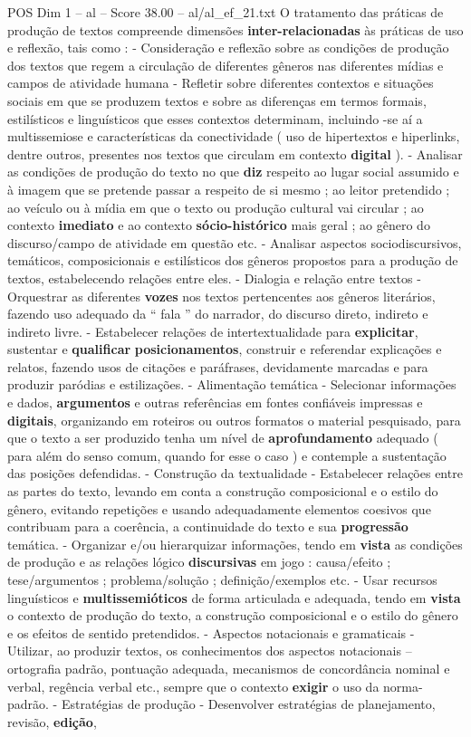 \begin{textsample}{POS Dim 1 – al – Score 38.00 – al/al\_ef\_21.txt}
O tratamento das práticas de produção de textos compreende dimensões \textbf{inter-relacionadas} às práticas de uso e reflexão, tais como : - Consideração e reflexão sobre as condições de produção dos textos que regem a circulação de diferentes gêneros nas diferentes mídias e campos de atividade humana - Refletir sobre diferentes contextos e situações sociais em que se produzem textos e sobre as diferenças em termos formais, estilísticos e linguísticos que esses contextos determinam, incluindo -se aí a multissemiose e características da conectividade ( uso de hipertextos e hiperlinks, dentre outros, presentes nos textos que circulam em contexto \textbf{digital} ). - Analisar as condições de produção do texto no que \textbf{diz} respeito ao lugar social assumido e à imagem que se pretende passar a respeito de si mesmo ; ao leitor pretendido ; ao veículo ou à mídia em que o texto ou produção cultural vai circular ; ao contexto \textbf{imediato} e ao contexto \textbf{sócio-histórico} mais geral ; ao gênero do discurso/campo de atividade em questão etc. - Analisar aspectos sociodiscursivos, temáticos, composicionais e estilísticos dos gêneros propostos para a produção de textos, estabelecendo relações entre eles. - Dialogia e relação entre textos - Orquestrar as diferentes \textbf{vozes} nos textos pertencentes aos gêneros literários, fazendo uso adequado da “ fala ” do narrador, do discurso direto, indireto e indireto livre. - Estabelecer relações de intertextualidade para \textbf{explicitar}, sustentar e \textbf{qualificar} \textbf{posicionamentos}, construir e referendar explicações e relatos, fazendo usos de citações e paráfrases, devidamente marcadas e para produzir paródias e estilizações. - Alimentação temática - Selecionar informações e dados, \textbf{argumentos} e outras referências em fontes confiáveis impressas e \textbf{digitais}, organizando em roteiros ou outros formatos o material pesquisado, para que o texto a ser produzido tenha um nível de \textbf{aprofundamento} adequado ( para além do senso comum, quando for esse o caso ) e contemple a sustentação das posições defendidas. - Construção da textualidade - Estabelecer relações entre as partes do texto, levando em conta a construção composicional e o estilo do gênero, evitando repetições e usando adequadamente elementos coesivos que contribuam para a coerência, a continuidade do texto e sua \textbf{progressão} temática. - Organizar e/ou hierarquizar informações, tendo em \textbf{vista} as condições de produção e as relações lógico \textbf{discursivas} em jogo : causa/efeito ; tese/argumentos ; problema/solução ; definição/exemplos etc. - Usar recursos linguísticos e \textbf{multissemióticos} de forma articulada e adequada, tendo em \textbf{vista} o contexto de produção do texto, a construção composicional e o estilo do gênero e os efeitos de sentido pretendidos. - Aspectos notacionais e gramaticais - Utilizar, ao produzir textos, os conhecimentos dos aspectos notacionais – ortografia padrão, pontuação adequada, mecanismos de concordância nominal e verbal, regência verbal etc., sempre que o contexto \textbf{exigir} o uso da norma-padrão. - Estratégias de produção - Desenvolver estratégias de planejamento, revisão, \textbf{edição}, 
\end{textsample}
